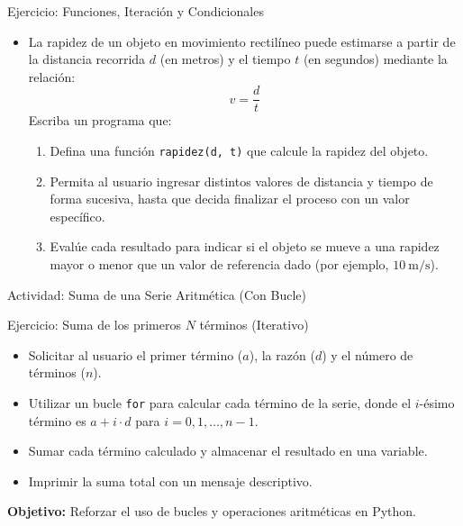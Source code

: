 \documentclass[10pt]{beamer}
\begin{document}
\begin{frame}{Ejercicio: Funciones, Iteración y Condicionales}
    \begin{itemize}
        \item La rapidez de un objeto en movimiento rectilíneo puede estimarse a partir de la distancia recorrida \( d \) (en metros) y el tiempo \( t \) (en segundos) mediante la relación:
        \[
        v = \frac{d}{t}
        \]
        Escriba un programa que:
        \begin{enumerate}
            \item Defina una función \texttt{rapidez(d, t)} que calcule la rapidez del objeto.
            \item Permita al usuario ingresar distintos valores de distancia y tiempo de forma sucesiva, hasta que decida finalizar el proceso con un valor específico.
            \item Evalúe cada resultado para indicar si el objeto se mueve a una rapidez mayor o menor que un valor de referencia dado (por ejemplo, \(10\ \text{m/s}\)).
        \end{enumerate}
        
    \end{itemize}
\end{frame}

\begin{frame}[fragile]{Actividad: Suma de una Serie Aritmética (Con Bucle)} 
    \begin{block}{Ejercicio: Suma de los primeros $N$ términos (Iterativo)} 
        \begin{itemize} 
            \item Solicitar al usuario el primer término ($a$), la razón ($d$) y el número de términos ($n$). 
            \item Utilizar un bucle \texttt{for} para calcular cada término de la serie, donde el $i$-ésimo término es $a+i⋅d$ para    $i=0,1,\ldots,n−1$. 
            \item Sumar cada término calculado y almacenar el resultado en una variable. 
            \item Imprimir la suma total con un mensaje descriptivo. 
        \end{itemize} 
    \end{block} 
    \vspace{0.2cm} 
    \textbf{Objetivo:} Reforzar el uso de bucles y operaciones aritméticas en Python. 
\end{frame}
    
\end{document}
